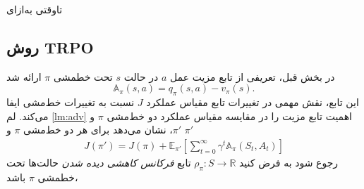 

‌تاوقتی
‌به‌ازای
\subsection{روش TRPO}
در بخش قبل، تعریفی از تابع مزیت عمل $a$ در حالت $s$ تحت خط\nf مشی 
$\pi$
ارائه شد
$$\mathbb{A}_\pi(s,a) = q_\pi(s,a) - v_\pi(s).$$
این تابع، نقش مهمی در تغییرات تابع مقیاس عملکرد $J$ نسبت به تغییرات خط‌مشی ایفا می‌کند. لم 
\ref{lm:adv}
اهمیت تابع مزیت را در مقایسه مقیاس عملکرد دو خط‌مشی $\pi$ و $\pi'$، نشان می‌دهد
برای هر دو خط‌مشی $\pi$ و $\pi'$
\begin{align}
J(\pi') = J(\pi) + \mathbb{E}_{\pi'}\left[\sum_{t=0}^{\infty} \gamma^t \mathbb{A}_\pi(S_t, A_t)\right]
\label{eq:adv}
\end{align}
\label{lm:adv}
رجوع شود به 
\cite{degris2012off}
فرض کنید
$\rho_\pi : S \longrightarrow \mathbb{R}$
تابع 
\textit{فرکانس کاهشی دیده شدن}
	 حالت‌ها تحت خط\nf مشی $\pi$ باشد،

